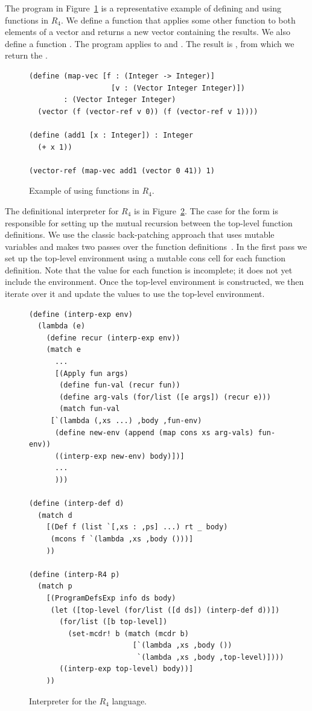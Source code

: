 \documentclass[11pt]{book}
\begin{document}
The program in Figure~\ref{fig:r4-function-example} is a
representative example of defining and using functions in $R_4$.  We
define a function  that applies some other function
 to both elements of a vector and returns a new
vector containing the results. We also define a function .
The program applies
 to  and .  The result is
, from which we return the .

\begin{figure}[tbp]
\begin{lstlisting}
(define (map-vec [f : (Integer -> Integer)]
                   [v : (Vector Integer Integer)])
        : (Vector Integer Integer)
  (vector (f (vector-ref v 0)) (f (vector-ref v 1))))

(define (add1 [x : Integer]) : Integer
  (+ x 1))

(vector-ref (map-vec add1 (vector 0 41)) 1)
\end{lstlisting}
\caption{Example of using functions in $R_4$.}
\label{fig:r4-function-example}
\end{figure}

The definitional interpreter for $R_4$ is in
Figure~\ref{fig:interp-R4}. The case for the  form is
responsible for setting up the mutual recursion between the top-level
function definitions. We use the classic back-patching 
approach that uses mutable variables and makes two passes over the function
definitions~\citep{Kelsey:1998di}.  In the first pass we set up the
top-level environment using a mutable cons cell for each function
definition. Note that the  value for each function is
incomplete; it does not yet include the environment.  Once the
top-level environment is constructed, we then iterate over it and
update the  values to use the top-level environment.

\begin{figure}[tp]
\begin{lstlisting}
(define (interp-exp env)
  (lambda (e)
    (define recur (interp-exp env))
    (match e
      ...
      [(Apply fun args)
       (define fun-val (recur fun))
       (define arg-vals (for/list ([e args]) (recur e)))
       (match fun-val
	 [`(lambda (,xs ...) ,body ,fun-env)
	  (define new-env (append (map cons xs arg-vals) fun-env))
	  ((interp-exp new-env) body)])]
      ...
      )))

(define (interp-def d)
  (match d
    [(Def f (list `[,xs : ,ps] ...) rt _ body)
     (mcons f `(lambda ,xs ,body ()))]
    ))

(define (interp-R4 p)
  (match p
    [(ProgramDefsExp info ds body)
     (let ([top-level (for/list ([d ds]) (interp-def d))])
       (for/list ([b top-level])
         (set-mcdr! b (match (mcdr b)
                        [`(lambda ,xs ,body ())
                         `(lambda ,xs ,body ,top-level)])))
       ((interp-exp top-level) body))]
    ))
\end{lstlisting}
\caption{Interpreter for the $R_4$ language.}
\label{fig:interp-R4}
\end{figure}
\end{document}
